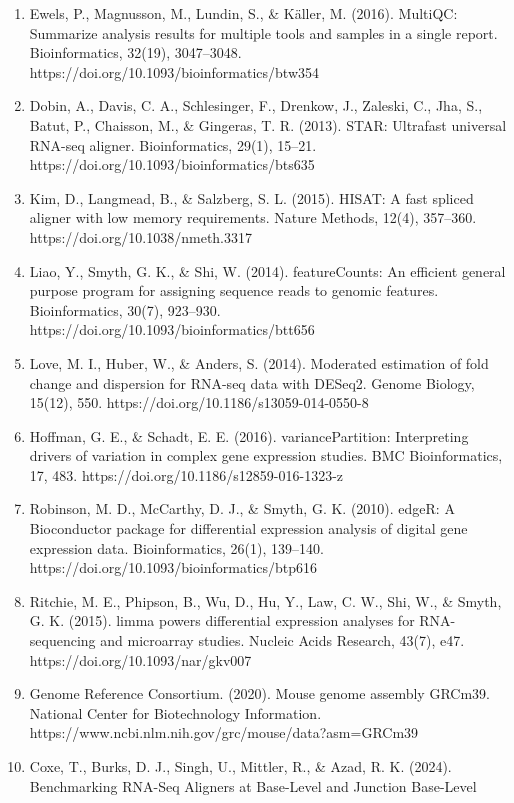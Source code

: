 \documentclass[
  9pt,
]{article}
\begin{document}
\begin{enumerate}
  https://www.bioinformatics.babraham.ac.uk/projects/fastqc/
\item
  Ewels, P., Magnusson, M., Lundin, S., \& Käller, M. (2016). MultiQC:
  Summarize analysis results for multiple tools and samples in a single
  report. Bioinformatics, 32(19), 3047--3048.
  https://doi.org/10.1093/bioinformatics/btw354
\item
  Dobin, A., Davis, C. A., Schlesinger, F., Drenkow, J., Zaleski, C.,
  Jha, S., Batut, P., Chaisson, M., \& Gingeras, T. R. (2013). STAR:
  Ultrafast universal RNA-seq aligner. Bioinformatics, 29(1), 15--21.
  https://doi.org/10.1093/bioinformatics/bts635
\item
  Kim, D., Langmead, B., \& Salzberg, S. L. (2015). HISAT: A fast
  spliced aligner with low memory requirements. Nature Methods, 12(4),
  357--360. https://doi.org/10.1038/nmeth.3317
\item
  Liao, Y., Smyth, G. K., \& Shi, W. (2014). featureCounts: An efficient
  general purpose program for assigning sequence reads to genomic
  features. Bioinformatics, 30(7), 923--930.
  https://doi.org/10.1093/bioinformatics/btt656
\item
  Love, M. I., Huber, W., \& Anders, S. (2014). Moderated estimation of
  fold change and dispersion for RNA-seq data with DESeq2. Genome
  Biology, 15(12), 550. https://doi.org/10.1186/s13059-014-0550-8
\item
  Hoffman, G. E., \& Schadt, E. E. (2016). variancePartition:
  Interpreting drivers of variation in complex gene expression studies.
  BMC Bioinformatics, 17, 483. https://doi.org/10.1186/s12859-016-1323-z
\item
  Robinson, M. D., McCarthy, D. J., \& Smyth, G. K. (2010). edgeR: A
  Bioconductor package for differential expression analysis of digital
  gene expression data. Bioinformatics, 26(1), 139--140.
  https://doi.org/10.1093/bioinformatics/btp616
\item
  Ritchie, M. E., Phipson, B., Wu, D., Hu, Y., Law, C. W., Shi, W., \&
  Smyth, G. K. (2015). limma powers differential expression analyses for
  RNA-sequencing and microarray studies. Nucleic Acids Research, 43(7),
  e47. https://doi.org/10.1093/nar/gkv007
\item
  Genome Reference Consortium. (2020). Mouse genome assembly GRCm39.
  National Center for Biotechnology Information.
  https://www.ncbi.nlm.nih.gov/grc/mouse/data?asm=GRCm39
\item
  Coxe, T., Burks, D. J., Singh, U., Mittler, R., \& Azad, R. K. (2024).
  Benchmarking RNA-Seq Aligners at Base-Level and Junction Base-Level

\end{enumerate}
\end{document}
